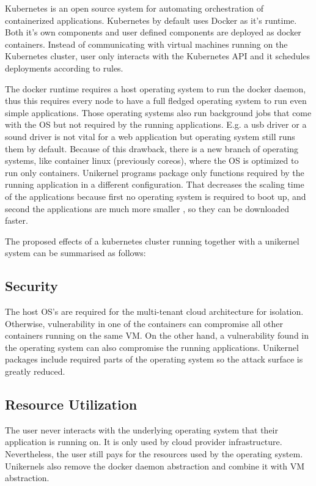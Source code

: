 Kubernetes is an open source system for automating orchestration of containerized applications. \cite{Hightower:2017:KUR:3175917} Kubernetes by default uses Docker as it's runtime. Both it's own components and user defined components are deployed as docker containers. Instead of communicating with virtual machines running on the Kubernetes cluster, user only interacts with the Kubernetes API and it schedules deployments according to rules. 

The docker runtime requires a host operating system to run the docker daemon, thus this requires every node to have a full fledged operating system to run even simple applications. Those operating systems also run background jobs that come with the OS but not required by the running applications. E.g. a usb driver or a sound driver is not vital for a web application but operating system still runs them by default. Because of this drawback, there is a new branch of operating systems, like container linux (previously coreos)\cite{coreos}, where the OS is optimized to run only containers. Unikernel programs package only functions required by the running application in a different configuration. That decreases the scaling time \cite{Podolskiy:2017:QCA:3069383.3069390} of the applications because first no operating system is required to boot up, and second the applications are much more smaller , so they can be downloaded faster.

The proposed effects of a kubernetes cluster running together with a unikernel system can be summarised as follows: 

\subsection{Security}
 The host OS's are required for the multi-tenant cloud architecture for isolation. Otherwise, vulnerability in one of the containers can compromise all other containers running on the same VM. On the other hand, a vulnerability found in the operating system can also compromise the running applications. Unikernel packages include required parts of the operating system so the attack surface is greatly reduced.

\subsection{Resource Utilization}
The user never interacts with the underlying operating system that their application is running on. It is only used by cloud provider infrastructure. Nevertheless, the user still pays for the resources used by the operating system. Unikernels also remove the docker daemon abstraction and combine it with VM abstraction.

